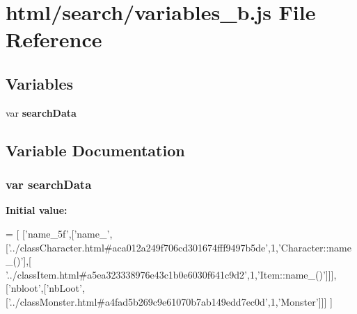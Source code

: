 \section{html/search/variables\-\_\-b.js File Reference}
\label{variables__b_8js}
\subsection*{Variables}
\begin{DoxyCompactItemize}
\item 
var {\bf search\-Data}
\end{DoxyCompactItemize}


\subsection{Variable Documentation}
\subsubsection[{search\-Data}]{\setlength{\rightskip}{0pt plus 5cm}var search\-Data}\label{variables__b_8js_ad01a7523f103d6242ef9b0451861231e}
{\bfseries Initial value\-:}
\begin{DoxyCode}
=
[
  [\textcolor{stringliteral}{'name\_5f'},[\textcolor{stringliteral}{'name\_'},[\textcolor{stringliteral}{'../classCharacter.html#aca012a249f706cd301674fff9497b5de'},1,\textcolor{stringliteral}{'Character::name\_()'}],[\textcolor{stringliteral}{
      '../classItem.html#a5ea323338976e43c1b0e6030f641c9d2'},1,\textcolor{stringliteral}{'Item::name\_()'}]]],
  [\textcolor{stringliteral}{'nbloot'},[\textcolor{stringliteral}{'nbLoot'},[\textcolor{stringliteral}{'../classMonster.html#a4fad5b269c9e61070b7ab149edd7ec0d'},1,\textcolor{stringliteral}{'Monster'}]]]
]
\end{DoxyCode}
